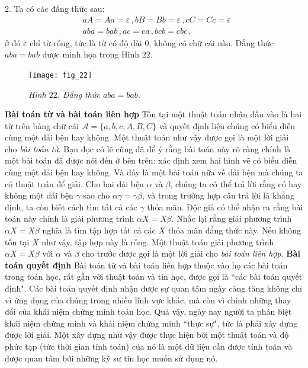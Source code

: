 \begin{multicols}{2}
	\vskip 0.1cm
	$2$. Ta có các đẳng thức sau:
	\begin{align*}
		&aA = Aa = \varepsilon\,, bB = Bb = \varepsilon\,, cC = Cc = \varepsilon\,\\
		&aba = bab\,, ac = ca\,, bcb = cbc\,,
	\end{align*}
	ở đó $\varepsilon$ chỉ từ rỗng, tức là từ có độ dài $0$, không có chữ cái nào. Đẳng thức $aba = bab$ được minh họa trong Hình $22$.
	\begin{figure}[H]
		\vspace*{5pt}
		\centering
		\captionsetup{labelformat= empty, justification=centering}
		\texttt{[image: fig\_22]}
		\caption{\small\textit{\color{duongvaotoanhoc}Hình $22$. Đẳng thức $aba = bab$.}}
		\vspace*{-15pt}
	\end{figure}
	\textbf{\color{duongvaotoanhoc}Bài toán từ và bài toán liên hợp}
	\vskip 0.05cm
	Tồn tại một thuật toán nhận đầu vào là hai từ trên bảng chữ cái $\mathcal A = \{a, b, c, A, B, C\}$ và quyết định liệu chúng có biểu diễn cùng một dải bện hay không. Một thuật toán như vậy được gọi là một lời giải cho \textit{bài toán từ}. Bạn đọc có lẽ cũng đã để ý rằng bài toán này rõ ràng chính là một bài toán đã được nói đến ở bên trên: xác định xem hai hình vẽ có biểu diễn cùng một dải bện hay không.
	\vskip 0.05cm
	Và đây là một bài toán nữa về dải bện mà chúng ta có thuật toán để giải. Cho hai dải bện $\alpha$ và $\beta$, chúng ta có thể trả lời rằng có hay không một dải bện $\gamma$ sao cho $\alpha \gamma = \gamma \beta$, và trong trường hợp câu trả lời là khẳng định, ta còn biết cách tìm tất cả các $\gamma$ thỏa mãn. Độc giả có thể nhận ra rằng bài toán này chính là giải phương trình $\alpha X = X \beta$. Nhắc lại rằng giải phương trình $\alpha X = X \beta$ nghĩa là tìm tập hợp tất cả các $X$ thỏa mãn đẳng thức này. Nếu không tồn tại $X$ như vậy, tập hợp này là rỗng. Một thuật toán giải phương trình $\alpha X = X \beta$ với $\alpha$ và $\beta$ cho trước được gọi là một lời giải cho \textit{bài toán liên hợp}.
	\vskip 0.05cm
	\textbf{\color{duongvaotoanhoc}Bài toán quyết định}
	\vskip 0.05cm
	Bài toán từ và bài toán liên hợp thuộc vào họ các bài toán trong toán học, rất gần với thuật toán và tin học, được gọi là ``các bài toán quyết định". Các bài toán quyết định nhận được sự quan tâm ngày càng tăng không chỉ vì ứng dụng của chúng trong nhiều lĩnh vực khác, mà còn vì chính những thay đổi của khái niệm chứng minh toán học. Quả vậy, ngày nay người ta phân biệt khái niệm chứng minh và khái niệm chứng minh ``thực sự", tức là phải xây dựng được lời giải. Một xây dựng như vậy được thực hiện bởi một thuật toán và độ phức tạp (tức thời gian tính toán) của nó là một dữ liệu cần được tính toán và được quan tâm bởi những kỹ sư tin học muốn sử dụng nó.

\end{multicols}
